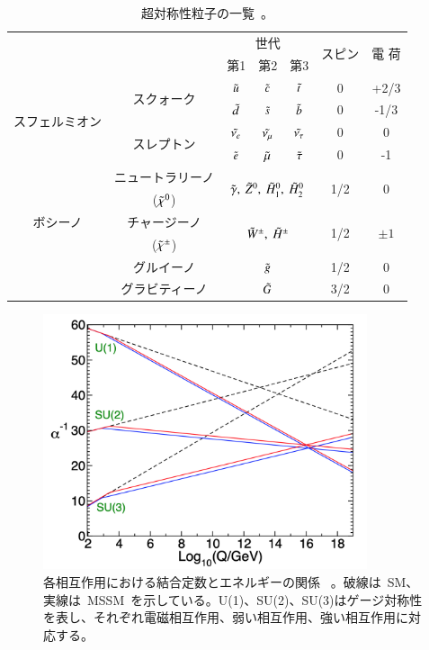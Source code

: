 \begin{table}[tbp]
	\centering
	\begin{tabular}{c|c|ccc|c|c} \hline
	& &\multicolumn{3}{c|}{世代}& \multirow{2}{*}{スピン} & \multirow{2}{*}{電 荷} \\
	& &第1&第2&第3&  &  \\ \hline
	\multirow{4}{*}{スフェルミオン} & \multirow{2}{*}{スクォーク} & $\Tilde{u}$ & $\Tilde{c}$ & $\Tilde{t}$ & 0 & +2/3 \\
	&  & $\Tilde{d}$ & $\Tilde{s}$ & $\Tilde{b}$ & 0 & -1/3 \\ \cline{2-5}
	& \multirow{2}{*}{スレプトン} & $\Tilde{\nu_e}$ & $\Tilde{\nu_{\mu}}$ & $\Tilde{\nu_{\tau}}$ & 0 & 0 \\
	&  & $\Tilde{e}$ & $\Tilde{\mu}$ & $\Tilde{\tau}$ & 0 & -1 \\ \hline\hline
	\multirow{5}{*}{ボシーノ} & ニュートラリーノ& \multicolumn{3}{c|}{\multirow{2}{*}{$\Tilde{\gamma},~\Tilde{Z}^0,~\Tilde{H}^{0}_1,~\Tilde{H}^{0}_2$}}& \multirow{2}{*}{1/2} & \multirow{2}{*}{0} \\
	&~($\Tilde{\chi}^0$)~&  &  & & & \\ \cline{2-5}
	& チャージーノ& \multicolumn{3}{c|}{\multirow{2}{*}{$\Tilde{W}^{\pm},~\Tilde{H}^{\pm}$}} & \multirow{2}{*}{1/2} & \multirow{2}{*}{$\pm1$} \\
	& ~($\Tilde{\chi}^{\pm}$)~ & &&&& \\ \cline{2-5}
	& グルイーノ & \multicolumn{3}{c|}{$\Tilde{g}$} & 1/2 & 0 \\ \cline{2-5}
	& グラビティーノ & \multicolumn{3}{c|}{$\Tilde{G}$} & 3/2 & 0 \\ \hline
	\end{tabular}
	\caption[超対称性粒子の一覧]{超対称性粒子の一覧~\cite{AR:12}。}
	\label{tb:SUSY}
\end{table}

\begin{figure}[H]
        \centering   
        \includegraphics[width=0.85\textwidth]{img/pdf/gut.png}
        \caption[各相互作用における結合定数とエネルギーの関係]{各相互作用における結合定数とエネルギーの関係~\cite{AR:01} 。破線は~SM、実線は~MSSM~を示している。U(1)、SU(2)、SU(3)はゲージ対称性を表し、それぞれ電磁相互作用、弱い相互作用、強い相互作用に対応する。}
        \label{fig:GUT}
\end{figure}

